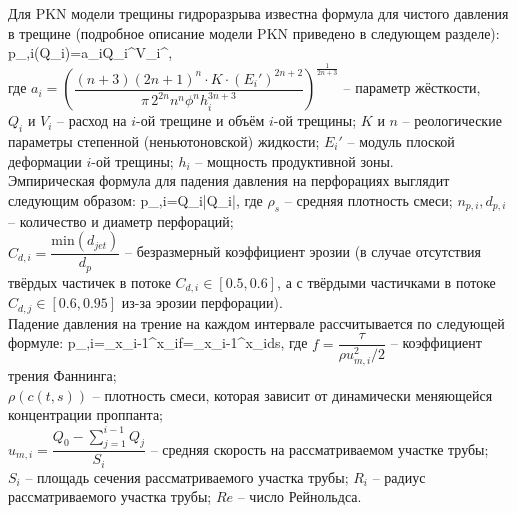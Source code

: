 Для PKN модели трещины гидроразрыва известна формула для чистого давления в трещине (подробное описание модели PKN приведено в следующем разделе):
\beq\label{1_3}
p_{,i}(Q_i)=a_iQ_i^{}V_i^{},
\eeq
\ \\
где $a_i=\left(\dfrac{(n+3)(2n+1)^n \cdot K\cdot (E_i')^{2n+2}}{\pi\, 2^{2n}n^n\phi^n h_i^{3n+3}}\right)^{\!\frac{1}{2n+3}}$ -- параметр жёсткости,\newline\\
$Q_i$ и $V_i$ -- расход на $i$-ой трещине и объём $i$-ой трещины;\newline
$K$ и $n$ -- реологические параметры степенной (неньютоновской) жидкости;\newline
$E_i'$ -- модуль плоской деформации $i$-ой трещины;\newline
$h_i$ -- мощность продуктивной зоны.
\\

Эмпирическая формула для падения давления на перфорациях выглядит следующим образом:
\beq\label{1_4}
\Delta p_{,i}=Q_i\left|Q_i\right|,
\eeq
где $\rho_s$ -- средняя плотность смеси;\newline
$n_{p,i}, d_{p,i}$ -- количество и диаметр перфораций;\newline\\
$C_{d,i}=\dfrac{\text{min}(d_{jet})}{d_p}$ -- безразмерный коэффициент эрозии (в случае отсутствия твёрдых частичек в потоке $C_{d,i}\in\left[0.5,0.6\right]$, а с твёрдыми частичками в потоке $C_{d,j}\in\left[0.6,0.95\right]$  из-за эрозии перфорации).
\\

Падение давления на трение на каждом интервале рассчитывается по следующей формуле:
\beq\label{1_5}
\Delta p_{,i}=\int\limits_{x_{i-1}}^{x_i}{f}=\int\limits_{x_{i-1}}^{x_i}{}ds,
\eeq
где $f=\dfrac{\tau}{\rho u_{m,i}^2/2}$ -- коэффициент трения Фаннинга;\newline\\
$\rho(c(t,s))$ -- плотность смеси, которая зависит от динамически меняющейся концентрации проппанта;\newline\\
$u_{m,i}=\dfrac{Q_0-\sum\limits_{j=1}^{i-1}{Q_j}}{S_i}$ -- средняя скорость на рассматриваемом участке трубы;\newline\\
$S_i$ -- площадь сечения рассматриваемого участка трубы;\newline
$R_i$ -- радиус рассматриваемого участка трубы;\newline
$Re$ -- число Рейнольдса.


